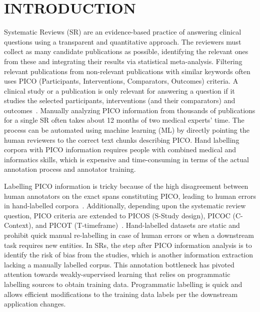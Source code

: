 \documentclass[10.7pt,]{article}
\begin{document}
\section{INTRODUCTION}\label{introduction}
%
Systematic Reviews (SR) are an evidence-based practice of answering clinical questions using a transparent and quantitative approach.
The reviewers must collect as many candidate publications as possible, identifying the relevant ones from these and integrating their results via statistical meta-analysis.
Filtering relevant publications from non-relevant publications with similar keywords often uses PICO (Participants, Interventions, Comparators, Outcomes) criteria. 
A clinical study or a publication is only relevant for answering a question if it studies the selected participants, interventions (and their comparators) and outcomes~\cite{uman2011systematic}. 
Manually analyzing PICO information from thousands of publications for a single SR often takes about 12 months of two medical experts' time.
The process can be automated using machine learning (ML) by directly pointing the human reviewers to the correct text chunks describing PICO.
Hand labelling corpora with PICO information requires people with combined medical and informatics skills, which is expensive and time-consuming in terms of the actual annotation process and annotator training.

Labelling PICO information is tricky because of the high disagreement between human annotators on the exact spans constituting PICO, leading to human errors in hand-labelled corpora~\cite{brockmeier2019improving}.
Additionally, depending upon the systematic review question, PICO criteria are extended to PICOS (S-Study design), PICOC (C-Context), and PICOT (T-timeframe)~\cite{riva2012your,methley2014pico,uman2011systematic}.
Hand-labelled datasets are static and prohibit quick manual re-labelling in case of human errors or when a downstream task requires new entities.
In SRs, the step after PICO information analysis is to identify the risk of bias from the studies, which is another information extraction lacking a manually labelled corpus. 
This annotation bottleneck has pivoted attention towards weakly-supervised learning that relies on programmatic labelling sources to obtain training data.
Programmatic labelling is quick and allows efficient modifications to the training data labels per the downstream application changes.
\end{document}
